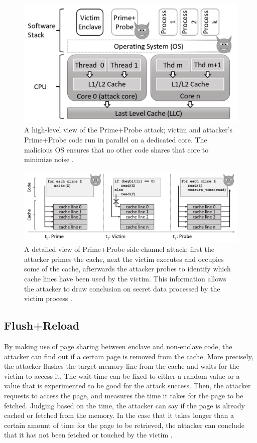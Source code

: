 \begin{figure}
	\includegraphics[scale=0.2]{images/pp1}
	\caption{A high-level view of the Prime+Probe attack; victim and attacker’s Prime+Probe code run in parallel on a dedicated core. The malicious OS  ensures  that  no  other  code shares that core to minimize noise \cite{brasser2017software}.}
	\label{fig:ppone}
\end{figure}
\begin{figure}
	\includegraphics[scale=0.2]{images/pp2}
	\caption{A detailed view of Prime+Probe side-channel attack; first the attacker primes the cache, next the victim executes and occupies some of the cache, afterwards the attacker probes to identify which cache lines have been used by the victim. This information allows the attacker to draw conclusion on secret data processed by the victim process \cite{brasser2017software}.}
	\label{fig:pptwo}
\end{figure}

\subsection{Flush+Reload}
By making use of page sharing between enclave and non-enclave code, the attacker can find out if a certain page is removed from the cache. More precisely, the attacker flushes the target memory line from the cache and waits for the victim to access it. The wait time can be fixed to either a random value or a value that is experimented to be good for the attack success. Then, the attacker requests to access the page, and measures the time it takes for the page to be fetched. Judging based on the time, the attacker can say if the page is already cached or fetched from the memory. In the case that it takes longer than a certain amount of time for the page to be retrieved, the attacker can conclude that it has not been fetched or touched by the victim \cite{flushreload}.

